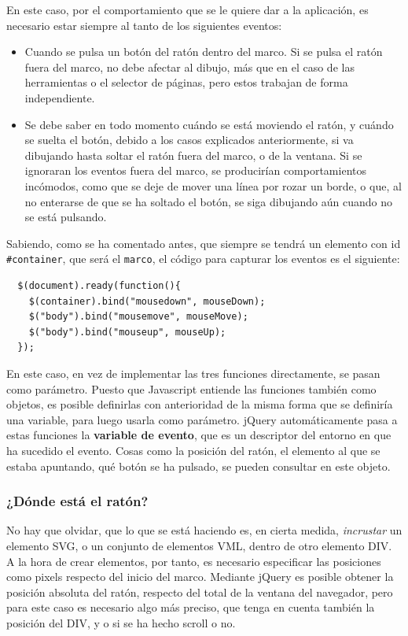En este caso, por el comportamiento que se le quiere dar a la aplicación, es necesario estar siempre al tanto de los siguientes eventos:
\begin{itemize}
  \item Cuando se pulsa un botón del ratón dentro del marco. Si se pulsa el ratón fuera del marco, no debe afectar al dibujo, más que en el caso de las herramientas o el selector de páginas, pero estos trabajan de forma independiente.
  \item Se debe saber en todo momento cuándo se está moviendo el ratón, y cuándo se suelta el botón, debido a los casos explicados anteriormente, si va dibujando hasta soltar el ratón fuera del marco, o de la ventana. Si se ignoraran los eventos fuera del marco, se producirían comportamientos incómodos, como que se deje de mover una línea por rozar un borde, o que, al no enterarse de que se ha soltado el botón, se siga dibujando aún cuando no se está pulsando.
\end{itemize}

Sabiendo, como se ha comentado antes, que siempre se tendrá un elemento con id \texttt{\#container}, que será el \texttt{marco}, el código para capturar los eventos es el siguiente:

\begin{verbatim}
  $(document).ready(function(){
    $(container).bind("mousedown", mouseDown);
    $("body").bind("mousemove", mouseMove);
    $("body").bind("mouseup", mouseUp);
  });
\end{verbatim}

En este caso, en vez de implementar las tres funciones directamente, se pasan como parámetro. Puesto que Javascript entiende las funciones también como objetos, es posible definirlas con anterioridad de la misma forma que se definiría una variable, para luego usarla como parámetro. jQuery automáticamente pasa a estas funciones la \textbf{variable de evento}, que es un descriptor del entorno en que ha sucedido el evento. Cosas como la posición del ratón, el elemento al que se estaba apuntando, qué botón se ha pulsado, se pueden consultar en este objeto.


\subsubsection{¿Dónde está el ratón?} %
\label{ssub:donde_esta_el_raton}

No hay que olvidar, que lo que se está haciendo es, en cierta medida, \emph{incrustar} un elemento SVG, o un conjunto de elementos VML, dentro de otro elemento DIV. A la hora de crear elementos, por tanto, es necesario especificar las posiciones como pixels respecto del inicio del marco. Mediante jQuery es posible obtener la posición absoluta del ratón, respecto del total de la ventana del navegador, pero para este caso es necesario algo más preciso, que tenga en cuenta también la posición del DIV, y o si se ha hecho scroll o no.

